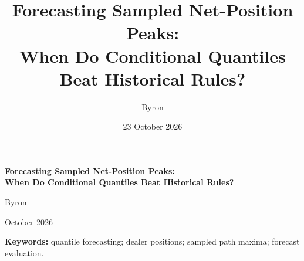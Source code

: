 \documentclass[11pt,a4paper]{article}
\title{Forecasting Sampled Net-Position Peaks:\\When Do Conditional Quantiles Beat Historical Rules?}
\author{Byron}
\date{23 October 2026}
\begin{document}
\begin{center}
{\bfseries\LARGE Forecasting Sampled Net-Position Peaks:\\[4pt]When Do Conditional Quantiles Beat Historical Rules?}\par\medskip
Byron\par{} October 2026
\end{center}
\begin{abstract}

\end{abstract}
\textbf{Keywords:} quantile forecasting; dealer positions; sampled path maxima; forecast evaluation.

\FloatBarrier

\clearpage
\label{appendix-start}
\appendix

\end{document}
